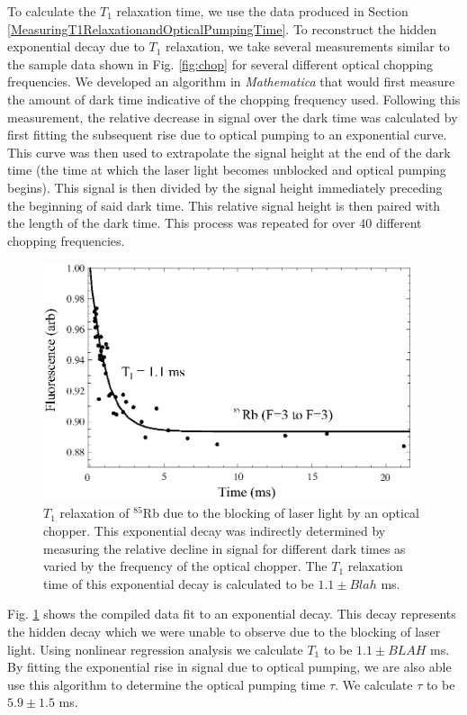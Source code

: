 To calculate the $T_1$ relaxation time, we use the data produced in Section \ref{MeasuringT1RelaxationandOpticalPumpingTime}.  To reconstruct the hidden exponential decay due to $T_1$ relaxation, we take several measurements similar to the sample data shown in Fig. \ref{fig:chop} for several different optical chopping frequencies.  We developed an algorithm in \emph{Mathematica} that would first measure the amount of dark time indicative of the chopping frequency used.  Following this measurement, the relative decrease in signal over the dark time was calculated by first fitting the subsequent rise due to optical pumping to an exponential curve.  This curve was then used to extrapolate the signal height at the end of the dark time (the time at which the laser light becomes unblocked and optical pumping begins).  This signal is then divided by the signal height immediately preceding the beginning of said dark time.  This relative signal height is then paired with the length of the dark time.  This process was repeated for over $40$ different chopping frequencies.  
\begin{figure}[htbp]
\begin{center}
\includegraphics[height=70mm]{./figures/T1.eps}
\caption{\small{$T_1$ relaxation of $^{85}$Rb due to the blocking of laser light by an optical chopper.  This exponential decay was indirectly determined by measuring the relative decline in signal for different dark times as varied by the frequency of the optical chopper.  The $T_1$ relaxation time of this exponential decay is calculated to be $1.1\pm Blah$ ms.}}
\label{fig:T1}
\end{center}
\end{figure}
Fig. \ref{fig:T1} shows the compiled data fit to an exponential decay.  This decay represents the hidden decay which we were unable to observe due to the blocking of laser light.  Using nonlinear regression analysis we calculate $T_1$ to be $1.1 \pm BLAH$ ms.  By fitting the exponential rise in signal due to optical pumping, we are also able use this algorithm to determine the optical pumping time $\tau$. We calculate $\tau$ to be  $5.9 \pm 1.5$ ms.  

